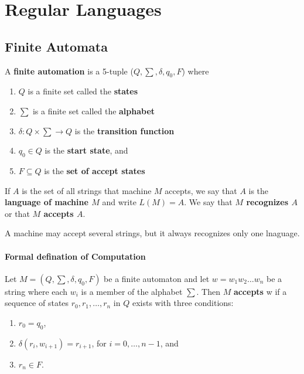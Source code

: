 \chapter{Regular Languages}

\section{Finite Automata}

\begin{defination}
    A \textbf{finite automation} is a 5-tuple ($Q, \sum, \delta, q_0, F$) where

    \begin{enumerate}
        \item $Q$ is a finite set called the \textbf{states}
        \item $\sum$ is a finite set called the \textbf{alphabet}
        \item $\delta: Q \times \sum \rightarrow Q$ is the \textbf{transition
            function}
        \item $q_0 \in Q$ is the \textbf{start state}, and
        \item $F \subseteq Q$ is the \textbf{set of accept states}
    \end{enumerate}
\end{defination}

If $A$ is the set of all strings that machine $M$ accepts, we say that $A$ is
the \textbf{language of machine $M$} and write $L(M) = A$. We say that
\textbf{$M$ recognizes $A$} or that \textbf{$M$ accepts $A$}.

A machine may accept several strings, but it always recognizes only one
lnaguage.

\subsubsection{Formal defination of Computation}

Let $M = (Q, \sum, \delta, q_0, F)$ be a finite automaton and let 
$w = w_1w_2\dots w_n$ be a string where each $w_i$ is a member of the alphabet
$\sum$. Then $M$ \textbf{accepts} w if a sequence of states $r_0, r_1, \dots,
r_n$ in $Q$ exists with three conditions:

\begin{enumerate}
    \item $r_0 = q_0$,
    \item $\delta(r_i, w_{i+1}) = r_{i+1}$, for $i = 0, \dots, n - 1$, and
    \item $r_n \in F$.
\end{enumerate}

